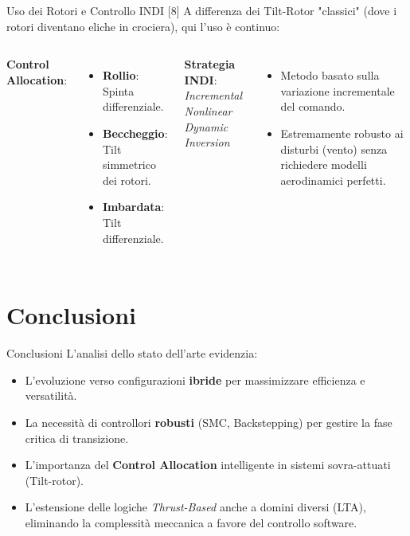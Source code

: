 \documentclass[aspectratio=169]{beamer}
\begin{document}
\begin{frame}{Uso dei Rotori e Controllo INDI [8]}
    A differenza dei Tilt-Rotor "classici" (dove i rotori diventano eliche in crociera), qui l'uso è continuo:
    \vspace{0.2cm}
    \begin{columns}
        \textbf{Control Allocation}:
        \begin{itemize}
            \item \textbf{Rollio}: Spinta differenziale.
            \item \textbf{Beccheggio}: Tilt simmetrico dei rotori.
            \item \textbf{Imbardata}: Tilt differenziale.
        \end{itemize}

        \textbf{Strategia INDI}: \\
        \textit{Incremental Nonlinear Dynamic Inversion}
        \begin{itemize}
            \item Metodo basato sulla variazione incrementale del comando.
            \item Estremamente robusto ai disturbi (vento) senza richiedere modelli aerodinamici perfetti.
        \end{itemize}
    \end{columns}
\end{frame}

\section{Conclusioni}

\begin{frame}{Conclusioni}
    L'analisi dello stato dell'arte evidenzia:
    \begin{itemize}
        \item L'evoluzione verso configurazioni \textbf{ibride} per massimizzare efficienza e versatilità.
        \item La necessità di controllori \textbf{robusti} (SMC, Backstepping) per gestire la fase critica di transizione.
        \item L'importanza del \textbf{Control Allocation} intelligente in sistemi sovra-attuati (Tilt-rotor).
        \item L'estensione delle logiche \textit{Thrust-Based} anche a domini diversi (LTA), eliminando la complessità meccanica a favore del controllo software.
    \end{itemize}
\end{frame}
\end{document}
